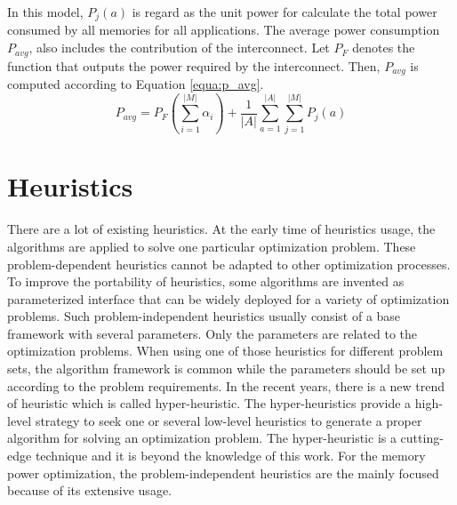 	In this model, $P_{j} \left( a \right) $ is regard as the unit power for
	calculate the total power consumed by all memories for all applications.
	The average power consumption $P_{avg}$, also includes the contribution
	of the interconnect. Let $P_{F}$ denotes the function that outputs the
	power required by the interconnect. Then,  $P_{avg}$ is computed
	according to Equation \ref{equa:p_avg}.
	\begin{equation}
	\label{equa:p_avg}
		P_{avg} = P_{F}(\sum_{i=1}^{\lvert M \rvert}\alpha_{i}) +
		\frac{1}{\lvert A \rvert}
		\sum_{a=1}^{\lvert A \rvert} \sum_{j=1}^{\lvert M \rvert}
		P_{j}\left( a \right) 
	\end{equation}						
	
	\section{Heuristics}
	\label{sec:heuristics}
	There are a lot of existing heuristics. At the early time of heuristics usage, the algorithms are applied to solve one
	particular optimization problem. These problem-dependent heuristics cannot be adapted to other optimization processes.
	To improve the portability of heuristics, some algorithms are invented as parameterized interface that can be widely
	deployed for a variety of optimization problems. Such problem-independent heuristics usually consist of a base framework
	with several parameters. Only the parameters are related to the optimization problems. When using one of those
	heuristics for different problem sets, the algorithm framework is common while the parameters should be set up according
	to the problem requirements. In the recent years, there is a new trend of heuristic which is called hyper-heuristic.
	The hyper-heuristics provide a high-level strategy to seek one or several low-level heuristics to generate a proper algorithm for solving an optimization problem. The hyper-heuristic is a cutting-edge technique and it is beyond the knowledge of this work. For the memory power optimization, the problem-independent heuristics are the mainly focused
	because of its extensive usage.
	
